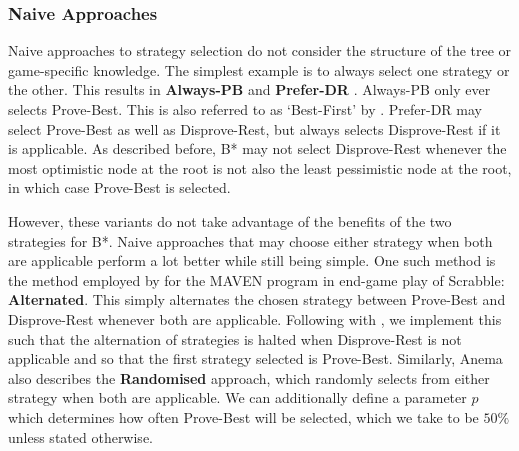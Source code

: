 \subsubsection{Naive Approaches}
\label{subsec:strategySelection:Naive}
Naive approaches to strategy selection do not consider the structure of the tree or game-specific knowledge. The simplest example is to always select one strategy or the other. This results in \textbf{Always-PB} and \textbf{Prefer-DR} \cite{Anema2025}. Always-PB only ever selects Prove-Best. This is also referred to as `Best-First' by . Prefer-DR may select Prove-Best as well as Disprove-Rest, but always selects Disprove-Rest if it is applicable. As described before, B* may not select Disprove-Rest whenever the most optimistic node at the root is not also the least pessimistic node at the root, in which case Prove-Best is selected.

However, these variants do not take advantage of the benefits of the two strategies for B*. Naive approaches that may choose either strategy when both are applicable perform a lot better \cite{Anema2025} while still being simple. One such method is the method employed by  for the MAVEN program in end-game play of Scrabble: \textbf{Alternated}. This simply alternates the chosen strategy between Prove-Best and Disprove-Rest whenever both are applicable. Following with , we implement this such that the alternation of strategies is halted when Disprove-Rest is not applicable and so that the first strategy selected is Prove-Best. Similarly, Anema also describes the \textbf{Randomised} approach, which randomly selects from either strategy when both are applicable. We can additionally define a parameter $p$ which determines how often Prove-Best will be selected, which we take to be $50\%$ unless stated otherwise.

